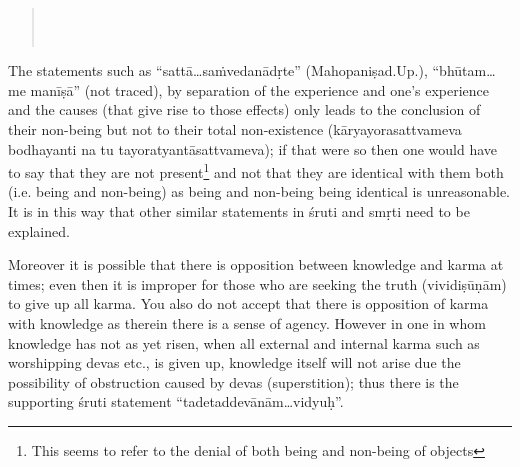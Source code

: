 


\begin{verse}
\\
\\
\end{verse}

The statements such as “sattā…saṁvedanādṛte” (Mahopaniṣad.Up.), “bhūtam…me manīṣā” (not traced), by separation of the experience and one’s experience and the causes (that give rise to those effects) only leads to the conclusion of their non-being but not to their total non-existence (kāryayorasattvameva bodhayanti na tu tayoratyantāsattvameva); if that were so then one would have to say that they are not present\footnote{This seems to refer to the denial of both being and non-being of objects} and not that they are identical with them both (i.e. being and non-being) as being and non-being being identical is unreasonable. It is in this way that other similar statements in śruti and smṛti need to be explained.

Moreover it is possible that there is opposition between knowledge and karma at times; even then it is improper for those who are seeking the truth (vividiṣūṇām) to give up all karma. You also do not accept that there is opposition of karma with knowledge as therein there is a sense of agency. However in one in whom knowledge has not as yet risen, when all external and internal karma  such as worshipping devas etc., is given up, knowledge itself will not arise due the possibility of obstruction caused by devas (superstition); thus there is the supporting  śruti statement “tadetaddevānām…vidyuḥ”.

